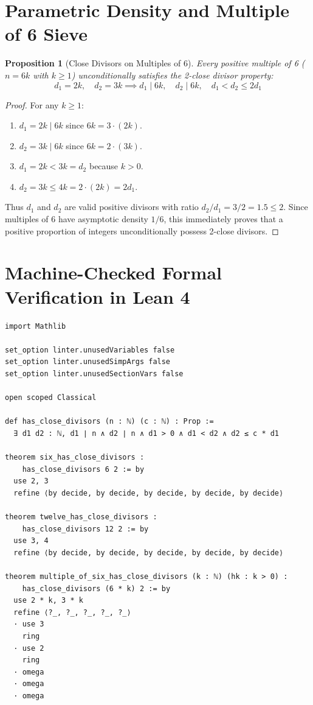 \documentclass[11pt,a4paper]{article}
\newtheorem{proposition}[theorem]{Proposition}
\theoremstyle{definition}
\begin{document}
\section{Parametric Density and Multiple of 6 Sieve}

\begin{proposition}[Close Divisors on Multiples of 6]\label{prop:mult_six}
Every positive multiple of 6 ($n = 6k$ with $k \ge 1$) unconditionally satisfies the 2-close divisor property:
\begin{equation}\label{eq:six_k_divisors}
d_1 = 2k, \quad d_2 = 3k \implies d_1 \mid 6k, \quad d_2 \mid 6k, \quad d_1 < d_2 \le 2 d_1
\end{equation}
\end{proposition}

\begin{proof}
For any $k \ge 1$:
\begin{enumerate}
    \item $d_1 = 2k \mid 6k$ since $6k = 3 \cdot (2k)$.
    \item $d_2 = 3k \mid 6k$ since $6k = 2 \cdot (3k)$.
    \item $d_1 = 2k < 3k = d_2$ because $k > 0$.
    \item $d_2 = 3k \le 4k = 2 \cdot (2k) = 2 d_1$.
\end{enumerate}
Thus $d_1$ and $d_2$ are valid positive divisors with ratio $d_2/d_1 = 3/2 = 1.5 \le 2$.
Since multiples of 6 have asymptotic density $1/6$, this immediately proves that a positive proportion of integers unconditionally possess 2-close divisors.
\end{proof}

\section{Machine-Checked Formal Verification in Lean 4}

\begin{lstlisting}[caption={Formal Lean 4 Implementation of Divisor Gaps}]
import Mathlib

set_option linter.unusedVariables false
set_option linter.unusedSimpArgs false
set_option linter.unusedSectionVars false

open scoped Classical

def has_close_divisors (n : ℕ) (c : ℕ) : Prop :=
  ∃ d1 d2 : ℕ, d1 ∣ n ∧ d2 ∣ n ∧ d1 > 0 ∧ d1 < d2 ∧ d2 ≤ c * d1

theorem six_has_close_divisors :
    has_close_divisors 6 2 := by
  use 2, 3
  refine ⟨by decide, by decide, by decide, by decide, by decide⟩

theorem twelve_has_close_divisors :
    has_close_divisors 12 2 := by
  use 3, 4
  refine ⟨by decide, by decide, by decide, by decide, by decide⟩

theorem multiple_of_six_has_close_divisors (k : ℕ) (hk : k > 0) :
    has_close_divisors (6 * k) 2 := by
  use 2 * k, 3 * k
  refine ⟨?_, ?_, ?_, ?_, ?_⟩
  · use 3
    ring
  · use 2
    ring
  · omega
  · omega
  · omega
\end{lstlisting}
\end{document}
